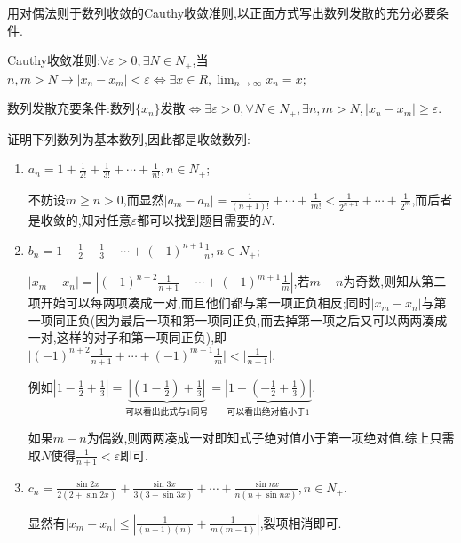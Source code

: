 \documentclass[cn,chinese]{elegantbook}
\begin{document}
            \hypertarget{Cauthy}{}
            \begin{exercise}
                用对偶法则于数列收敛的Cauthy收敛准则,以正面方式写出数列发散的充分必要条件.
            \end{exercise}
            \begin{solution}

                Cauthy收敛准则:$\forall \varepsilon>0,\exists N\in N_+$,当$ n,m>N\rightarrow\lvert x_n-x_m\rvert<\varepsilon\Longleftrightarrow \exists x\in R,\lim_{n\to\infty}x_n=x$;

                数列发散充要条件:数列$\{x_n\}$发散$\Longleftrightarrow \exists\varepsilon>0,\forall N\in N_+,\exists n,m>N,\lvert x_n-x_m\rvert\geqslant \varepsilon$.
            \end{solution}

            \begin{exercise}
                证明下列数列为基本数列,因此都是收敛数列:
                \begin{enumerate}
                    \item $a_n=1+\frac{1}{2!}+\frac{1}{3!}+\cdots+\frac{1}{n!},n\in N_+$;
                    \begin{solution}
                        不妨设$m\geqslant n>0$,而显然$\lvert a_m-a_n\rvert=\frac{1}{(n+1)!}+\cdots+\frac{1}{m!}<\frac{1}{2^{n+1}}+\cdots+\frac{1}{2^m}$,而后者是收敛的,知对任意$\varepsilon$都可以找到题目需要的$N$.
                    \end{solution}
                    \item $b_n=1-\frac{1}{2}+\frac{1}{3}-\cdots+(-1)^{n+1}\frac{1}{n},n\in N_+$;
                    \begin{solution}
                        $\lvert x_m-x_n\rvert=\left|(-1)^{n+2}\frac{1}{n+1}+\cdots+(-1)^{m+1}\frac{1}{m}\right|$,若$m-n$为奇数,则知从第二项开始可以每两项凑成一对,而且他们都与第一项正负相反;同时$\lvert x_m-x_n\rvert$与第一项同正负(因为最后一项和第一项同正负,而去掉第一项之后又可以两两凑成一对,这样的对子和第一项同正负),即$\big\lvert (-1)^{n+2}\frac{1}{n+1}+\cdots+(-1)^{m+1}\frac{1}{m}\big\rvert<\lvert \frac{1}{n+1}\rvert$.

                        例如$\left|1-\frac{1}{2}+\frac{1}{3}\right|=\underbrace{\left|(1-\frac{1}{2})+\frac{1}{3}\right|}_{\text{可以看出此式与1同号}}=\underbrace{\left|1+(-\frac{1}{2}+\frac{1}{3})\right|}_{\text{可以看出绝对值小于1}}$.

                        如果$m-n$为偶数,则两两凑成一对即知式子绝对值小于第一项绝对值.综上只需取$N$使得$\frac{1}{n+1}<\varepsilon$即可.
                    \end{solution}
                    \item $c_n=\frac{\sin2x}{2(2+\sin2x)}+\frac{\sin3x}{3(3+\sin3x)}+\cdots+\frac{\sin nx}{n(n+\sin nx)},n\in N_+$.
                    \begin{solution}
                        显然有$\left|x_m-x_n\right|\leqslant\left|\frac{1}{(n+1)(n)}+\frac{1}{m(m-1)}\right|$,裂项相消即可.
                    \end{solution}
                \end{enumerate}
            \end{exercise}
\end{document}
